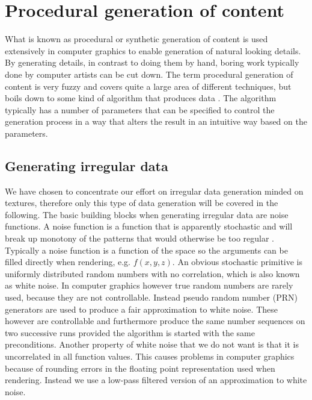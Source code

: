 
\chapter{Procedural generation of content}
\label{chap:noise}
What is known as procedural or synthetic generation of content is
used extensively in computer graphics to enable generation of natural
looking details. By generating details, in contrast to doing them by
hand, boring work typically done by computer artists can be cut down.
%
The term procedural generation of content is very fuzzy and covers
quite a large area of different techniques, but boils down to some
kind of algorithm that produces data .
The algorithm typically has a number of parameters that can be
specified to control the generation process in a way that alters the
result in an intuitive way based on the parameters.

\section{Generating irregular data}
We have chosen to concentrate our effort on irregular data generation
minded on textures, therefore only this type of data generation
will be covered in the following.
%
The basic building blocks when generating irregular data are
noise functions. A noise function is a function that is apparently
stochastic and will break up monotony of the patterns that would
otherwise be too regular .
%
Typically a noise function is a function of the space so the arguments
can be filled directly when rendering, e.g. $f(x,y,z)$.
%
An obvious stochastic primitive is uniformly distributed random
numbers with no correlation, which is also known as white noise.
In computer graphics however true random numbers are rarely used,
because they are not controllable.
Instead pseudo random number (PRN) generators are used to produce a
fair approximation to white noise. These however are controllable and
furthermore produce the same number sequences on two successive runs
provided the algorithm is started with the same preconditions.
%
Another property of white noise that we do not want is that it is
uncorrelated in all function values. This causes problems in computer
graphics because of rounding errors in the floating point
representation used when rendering. Instead we use a low-pass filtered
version of an approximation to white noise.

